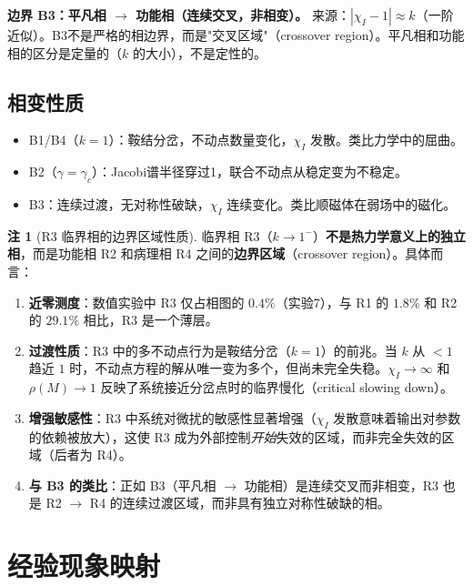 \documentclass[12pt,a4paper]{article}
\theoremstyle{definition}
\newtheorem{remark}[theorem]{注}
\newcommand{\chiI}{\chi_I}
\newcommand{\gamc}{\gamma_c}
\begin{document}
\textbf{边界 B3：平凡相 $\to$ 功能相（连续交叉，非相变）。}
来源：$|\chiI - 1| \approx k$（一阶近似）。B3不是严格的相边界，而是"交叉区域"（crossover region）。平凡相和功能相的区分是定量的（$k$ 的大小），不是定性的。

\subsection{相变性质}

\begin{itemize}[leftmargin=*]
\item B1/B4（$k = 1$）：鞍结分岔，不动点数量变化，$\chiI$ 发散。类比力学中的屈曲。
\item B2（$\gamma = \gamc$）：Jacobi谱半径穿过1，联合不动点从稳定变为不稳定。
\item B3：连续过渡，无对称性破缺，$\chiI$ 连续变化。类比顺磁体在弱场中的磁化。
\end{itemize}

\begin{remark}[R3 临界相的边界区域性质]
\label{rem:r3-boundary}
临界相 R3（$k \to 1^-$）\textbf{不是热力学意义上的独立相}，而是功能相 R2 和病理相 R4 之间的\textbf{边界区域}（crossover region）。具体而言：
\begin{enumerate}[leftmargin=*]
\item \textbf{近零测度}：数值实验中 R3 仅占相图的 $0.4\%$（实验7），与 R1 的 $1.8\%$ 和 R2 的 $29.1\%$ 相比，R3 是一个薄层。
\item \textbf{过渡性质}：R3 中的多不动点行为是鞍结分岔（$k=1$）的前兆。当 $k$ 从 $<1$ 趋近 $1$ 时，不动点方程的解从唯一变为多个，但尚未完全失稳。$\chiI \to \infty$ 和 $\rho(M) \to 1$ 反映了系统接近分岔点时的临界慢化（critical slowing down）。
\item \textbf{增强敏感性}：R3 中系统对微扰的敏感性显著增强（$\chiI$ 发散意味着输出对参数的依赖被放大），这使 R3 成为外部控制\emph{开始}失效的区域，而非完全失效的区域（后者为 R4）。
\item \textbf{与 B3 的类比}：正如 B3（平凡相 $\to$ 功能相）是连续交叉而非相变，R3 也是 R2 $\to$ R4 的连续过渡区域，而非具有独立对称性破缺的相。
\end{enumerate}
\end{remark}

\section{经验现象映射}
\label{sec:phenomena}
\end{document}
